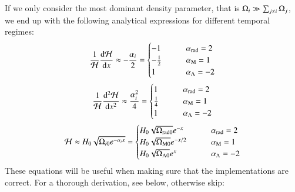     If we only consider the most dominant density parameter, that is $\Omega_i \gg \sum_{j\neq i}\Omega_j$, we end up with the following analytical expressions for different temporal regimes:
    \begin{equation}
        \label{eq:m1:theory:sanity:first_deriv_sanity}
        \frac{1}{\mathcal{H}}\dv{\mathcal{H}}{x} \approx - \frac{\alpha_i}{2} = 
        \begin{cases}
            -1 \qquad &\alpha_\mathrm{rad} = 2 \\
            -\frac{1}{2} \qquad &\alpha_\mathrm{M} = 1\\
            1 \qquad &\alpha_\Lambda = -2
        \end{cases}
    \end{equation}
    \begin{equation}
        \label{eq:m1:theory:sanity:second_deriv_sanity}
        \frac{1}{\mathcal{H}}\dv[2]{\mathcal{H}}{x} \approx \frac{\alpha_i^2}{4} = 
        \begin{cases}
            1 \qquad &\alpha_\mathrm{rad} = 2 \\
            \frac{1}{4} \qquad &\alpha_\mathrm{M} = 1\\
            1 \qquad &\alpha_\Lambda = -2
        \end{cases}
    \end{equation}
    \begin{equation}
        \label{eq:m1:theory:sanity:conformal_hubble}
        \mathcal{H} \approx H_0\sqrt{\Omega_{i0}e^{-\alpha_ix}} = 
        \begin{cases}
            H_0\sqrt{\Omega_\mathrm{rad0}}e^{-x} \qquad &\alpha_\mathrm{rad} = 2 \\
            H_0\sqrt{\Omega_\mathrm{M0}}e^{-x/2} \qquad &\alpha_\mathrm{M} = 1\\
            H_0\sqrt{\Omega_{\Lambda0}}e^x \qquad &\alpha_\Lambda = -2
        \end{cases}
    \end{equation}
    These equations will be useful when making sure that the implementations are correct.
    For a thorough derivation, see below, otherwise skip:

